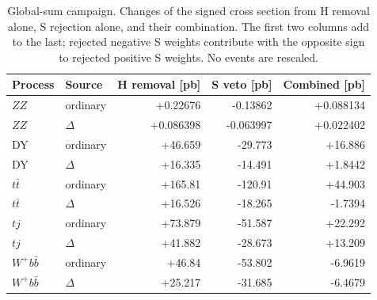 \begin{table}[tbp]
\centering\small
\begin{tabular}{llrrr}
\toprule
Process & Source & H removal [pb] & S veto [pb] & Combined [pb]\\
\midrule
$ZZ$ & ordinary & +0.22676 & -0.13862 & +0.088134\\
$ZZ$ & $\Delta$ & +0.086398 & -0.063997 & +0.022402\\
DY & ordinary & +46.659 & -29.773 & +16.886\\
DY & $\Delta$ & +16.335 & -14.491 & +1.8442\\
$t\bar t$ & ordinary & +165.81 & -120.91 & +44.903\\
$t\bar t$ & $\Delta$ & +16.526 & -18.265 & -1.7394\\
$tj$ & ordinary & +73.879 & -51.587 & +22.292\\
$tj$ & $\Delta$ & +41.882 & -28.673 & +13.209\\
$W^+b\bar b$ & ordinary & +46.84 & -53.802 & -6.9619\\
$W^+b\bar b$ & $\Delta$ & +25.217 & -31.685 & -6.4679\\
\bottomrule
\end{tabular}
\caption{Global-sum campaign. Changes of the signed cross section from H removal alone, S rejection alone, and their combination. The first two columns add to the last; rejected negative S weights contribute with the opposite sign to rejected positive S weights. No events are rescaled.}
\label{tab:effects}
\end{table}
